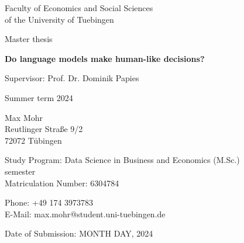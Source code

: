 \documentclass[12pt, a4paper, titlepage]{article}
\begin{document}
\begin{titlepage}
  \begin{center}
    Faculty of Economics and Social Sciences\\
    of the University of Tuebingen

    \vspace{3cm}

    Master thesis

    \vspace{1cm}

    {\Large\textbf{Do language models make human-like decisions?}}

    \vspace{0.5cm}

    Supervisor: Prof. Dr. Dominik Papies

    \vspace{0.5cm}

    Summer term 2024

  \end{center}

  \vfill

  \begin{multicols}{2}

    Max Mohr\\
    Reutlinger Straße 9/2\\
    72072 Tübingen

    \vfill

    Study Program: Data Science in Business and Economics (M.Sc.)\\
     semester\\
    Matriculation Number: 6304784
  \end{multicols}

  \begin{multicols}{2}
    Phone: +49 174 3973783\\
    E-Mail: max.mohr@student.uni-tuebingen.de\\

    \vfill

    Date of Submission: MONTH DAY, 2024

  \end{multicols}
\end{titlepage}


\newpage
{} %
\setcounter{page}{2}
\tableofcontents


\clearpage
{} %
\end{document}
